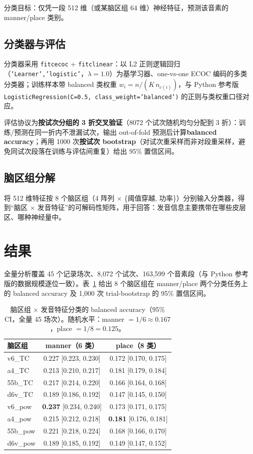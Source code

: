 \documentclass[11pt,a4paper]{ctexart}
\begin{document}
分类目标：仅凭一段 512 维（或某脑区组 64 维）神经特征，预测该音素的 manner/place 类别。

\subsection{分类器与评估}

分类器采用 \texttt{fitcecoc} + \texttt{fitclinear}：以 L2 正则逻辑回归（\texttt{'Learner','logistic'}，$\lambda = 1.0$）为基学习器、one-vs-one ECOC 编码的多类分类器；训练样本带 balanced 类权重 $w_i = n/(K\,n_{c(i)})$，与 Python 参考版 \texttt{LogisticRegression(C=0.5, class\_weight='balanced')} 的正则与类权重口径对应。

评估协议为\textbf{按试次分组的 3 折交叉验证}（8072 个试次随机均匀分配到 3 折）：训练/预测在同一折内不泄漏试次，输出 out-of-fold 预测后计算\textbf{balanced accuracy}；再用 1000 次\textbf{按试次 bootstrap}（对试次重采样而非对段重采样，避免同试次段落在训练与评估间重复）给出 95\% 置信区间。

\subsection{脑区组分解}

将 512 维特征按 8 个脑区组（4 阵列 $\times$ \{阈值穿越, 功率\}）分别输入分类器，得到``脑区 $\times$ 发音特征''的可解码性矩阵，用于回答：发音信息主要携带在哪些皮层区、哪种神经量中。

\section{结果}

全量分析覆盖 45 个记录场次、8{,}072 个试次、163{,}599 个音素段（与 Python 参考版的数据规模逐位一致）。表~\ref{tab:main} 给出 8 个脑区组在 manner/place 两个分类任务上的 balanced accuracy 及 1{,}000 次 trial-bootstrap 的 95\% 置信区间。

\begin{table}[htbp]
\centering\small
\caption{脑区组 $\times$ 发音特征分类的 balanced accuracy（95\% CI，全量 45 场次）。随机水平：manner $=1/6\approx0.167$，place $=1/8=0.125$。}
\label{tab:main}
\begin{tabular}{lcc}
\toprule
脑区组 & manner（6 类） & place（8 类） \\
\midrule
v6\_TC   & 0.227 [0.223, 0.230] & 0.172 [0.170, 0.175] \\
a4\_TC   & 0.213 [0.210, 0.217] & 0.181 [0.179, 0.184] \\
55b\_TC  & 0.217 [0.214, 0.220] & 0.166 [0.164, 0.168] \\
d6v\_TC  & 0.189 [0.186, 0.192] & 0.147 [0.145, 0.150] \\
v6\_pow  & \textbf{0.237} [0.234, 0.240] & 0.173 [0.171, 0.175] \\
a4\_pow  & 0.215 [0.212, 0.218] & \textbf{0.181} [0.176, 0.181] \\
55b\_pow & 0.221 [0.218, 0.224] & 0.168 [0.166, 0.170] \\
d6v\_pow & 0.189 [0.185, 0.192] & 0.149 [0.147, 0.152] \\
\bottomrule
\end{tabular}
\end{table}
\end{document}
